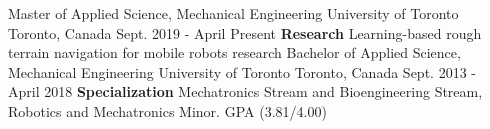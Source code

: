 \begin{cventries}
  \cventry
    {Master of Applied Science, Mechanical Engineering}
    {University of Toronto}
    {Toronto, Canada}
    {Sept. 2019 - April Present}
    {\textbf{Research} Learning-based rough terrain navigation for mobile robots research}
  \cventry
    {Bachelor of Applied Science, Mechanical Engineering}
    {University of Toronto}
    {Toronto, Canada}
    {Sept. 2013 - April 2018}
    {\textbf{Specialization} Mechatronics Stream and Bioengineering Stream, Robotics and Mechatronics Minor. GPA (3.81/4.00)}
\end{cventries}
